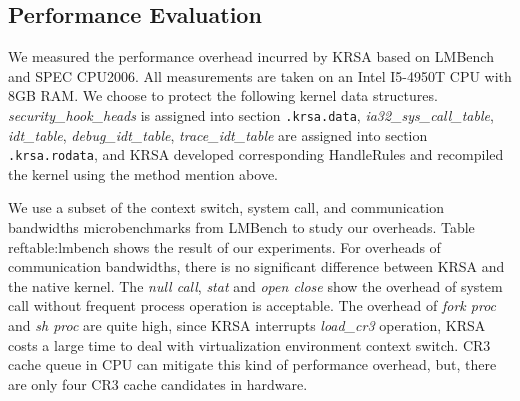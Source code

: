 \documentclass[conference]{IEEEtran}
\begin{document}
\subsection{Performance Evaluation} \label{sec:perfeva}

We measured the performance overhead incurred by KRSA based on LMBench and SPEC CPU2006. All measurements are taken on an Intel I5-4950T CPU with 8GB RAM. 
We choose to protect the following kernel data structures. 
\textit{security\_hook\_heads} is assigned into section \verb|.krsa.data|, \textit{ia32\_sys\_call\_table}, \textit{idt\_table}, \textit{debug\_idt\_table}, \textit{trace\_idt\_table} are assigned into section \verb|.krsa.rodata|, and KRSA developed corresponding HandleRules and recompiled the kernel using the method mention above. 

We use a subset of the context switch, system call, and communication bandwidths microbenchmarks from LMBench to study our overheads. Table ref{table:lmbench} shows the result of our experiments.
For overheads of communication bandwidths, there is no significant difference between KRSA and the native kernel. 
The \textit{null call}, \textit{stat} and \textit{open close} show the overhead of system call without frequent process operation is acceptable. 
The overhead of \textit{fork proc} and \textit{sh proc} are quite high, since KRSA interrupts \textit{load\_cr3} operation, KRSA costs a large time to deal with virtualization environment context switch. CR3 cache queue in CPU can mitigate this kind of performance overhead, but, there are only four CR3 cache candidates in hardware. 
\end{document}
